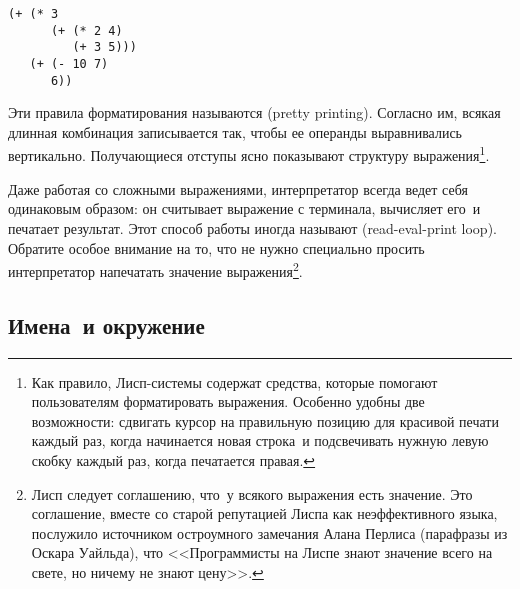 \begin{Verbatim}[fontsize=\small]
(+ (* 3
      (+ (* 2 4)
         (+ 3 5)))
   (+ (- 10 7)
      6))
\end{Verbatim}
Эти правила форматирования называются  (pretty printing). Согласно им, всякая длинная комбинация
записывается так, чтобы ее операнды выравнивались вертикально.
Получающиеся отступы ясно показывают структуру
выражения\footnote{Как правило, Лисп-системы содержат средства,
которые помогают пользователям
форматировать выражения.  Особенно удобны две
возможности: сдвигать курсор на правильную позицию для красивой печати 
каждый раз, когда начинается новая строка~и подсвечивать нужную левую
скобку каждый раз, когда печатается правая.}.

 Даже работая со сложными выражениями, интерпретатор
всегда ведет себя одинаковым образом: он считывает выражение с
терминала, вычисляет его~и печатает результат.  
Этот способ работы
иногда называют  (read-eval-print loop).
Обратите особое внимание на то, что не нужно специально просить
интерпретатор напечатать значение выражения\footnote{Лисп следует соглашению, что~у всякого
выражения есть  значение.  Это соглашение, вместе
со старой репутацией Лиспа как
неэффективного языка, послужило источником остроумного замечания Алана 
Перлиса (парафразы из Оскара Уайльда), что <<Программисты на Лиспе
знают значение всего на свете, но ничему не знают цену>>.
}.

\subsection{Имена~и окружение}
\label{NAMING-AND-THE-ENVIRONMENT}


